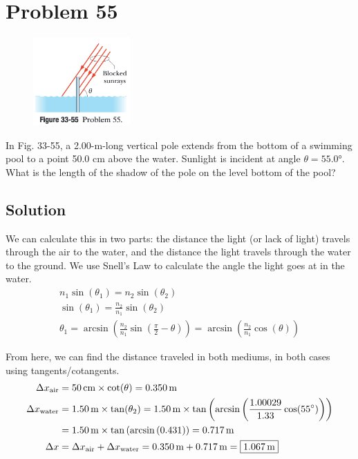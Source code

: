 \documentclass[12pt]{article}
\begin{document}
    \pagebreak
    \section{Problem 55}
        \begin{figure}
            \vspace{-30pt}
            \includegraphics[width=0.33\textwidth]{33-55.png} 
        \end{figure}
        In Fig. 33-55, a 2.00-m-long vertical pole extends from the bottom of a swimming pool to a point 50.0 cm above the water.
        Sunlight is incident at angle $\theta = 55.0\unit{\degree}$. What is the length of the shadow of the pole on the level bottom of the pool?

        \subsection{Solution}
            We can calculate this in two parts: the distance the light (or lack of light) travels through the air to the water, and the distance the light travels through the water to the ground.
            We use Snell's Law to calculate the angle the light goes at in the water.
            \begin{gather}
                n_1 \sin(\theta_1) = n_2 \sin(\theta_2)\\
                \sin(\theta_1) = \frac{n_2}{n_1} \sin(\theta_2)\\
                \theta_1    =   \arcsin\left( \frac{n_2}{n_1} \sin\left( \frac{\pi}{2} - \theta \right) \right)
                    =   \arcsin\left( \frac{n_2}{n_1} \cos(\theta) \right)
            \end{gather}

            From here, we can find the distance traveled in both mediums, in both cases using tangents/cotangents.
            \begin{align}
                \Delta x_{\rm air}  &=  50\,\unit{\centi\meter} \times \cot(\theta)
                    =   0.350\,\unit{\meter}\\
                \Delta x_{\rm water}&=  1.50\,\unit{\meter} \times \tan(\theta_2)
                    =   1.50\,\unit{\meter} \times \tan\left( \arcsin\left( \frac{1.00029}{1.33} \cos(55\unit{\degree}) \right) \right)\\
                    &=  1.50\,\unit{\meter} \times \tan\left( \arcsin\left( 0.431 \right) \right)
                    =   0.717\,\unit{\meter}\\
                \Delta x    &=  \Delta x_{\rm air} + \Delta x_{\rm water}
                    =   0.350\,\unit{\meter} + 0.717\,\unit{\meter}
                    =   \boxed{1.067\,\unit{\meter}}
            \end{align}
\end{document}

